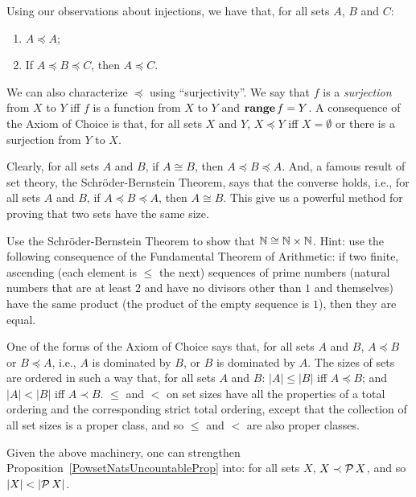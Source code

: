 Using our observations about injections, we have that,
for all sets $A$, $B$ and $C$:
\begin{enumerate}[\quad (1)]
\item $A\preceq A$;

\item If $A\preceq B\preceq C$, then $A\preceq C$.
\end{enumerate}
We can also characterize $\preceq$ using ``surjectivity''. We
say that $f$ is a \emph{surjection} from $X$ to $Y$ iff $f$ is a function
%
%
from $X$ to $Y$ and $\mathbf{range}\,f = Y$. A consequence of the
Axiom of Choice is that, for all sets $X$ and $Y$, $X\preceq Y$ iff
%
$X = \emptyset$ or there is a surjection from $Y$ to $X$.

Clearly, for all sets $A$ and $B$,
if $A\cong B$, then $A\preceq B\preceq A$.  And, a famous result
of set theory, the Schr\"oder-Bernstein Theorem,
%
says that the converse holds, i.e.,
for all sets $A$ and $B$, if $A\preceq B\preceq A$, then
$A\cong B$. This give us a powerful method for proving that two
sets have the same size.

\begin{exercise}
Use the Schr\"oder-Bernstein Theorem to show that
$\mathbb{N}\cong\mathbb{N}\times\mathbb{N}$.  Hint: use the following consequence of
the Fundamental Theorem of Arithmetic: if two finite, ascending (each
%
element is $\leq$ the next) sequences of prime numbers (natural
numbers that are at least $2$ and have no divisors other than $1$ and
themselves) have the same product (the product of the empty sequence is
$1$), then they are equal.
\end{exercise}

One of the forms of the Axiom of Choice
%
says that, for all sets $A$ and $B$, $A\preceq B$ or
$B\preceq A$, i.e., $A$ is dominated by $B$, or $B$ is
dominated by $A$. The sizes of sets are ordered in such a way that,
for all sets $A$ and $B$: $|A|\leq|B|$ iff $A\preceq B$; and $|A|<|B|$
iff $A\prec B$. $\leq$ and $<$ on set sizes have all the properties of a
total ordering and the corresponding strict total ordering, except
that the collection of all set sizes is a proper class, and so
$\leq$ and $<$ are also proper classes.

Given the above machinery, one can strengthen
Proposition~\ref{PowsetNatsUncountableProp} into: for
all sets $X$, $X\prec {\cal P} \,X$, and so $|X|<|\powset\,X|$.
%
%
%
%

